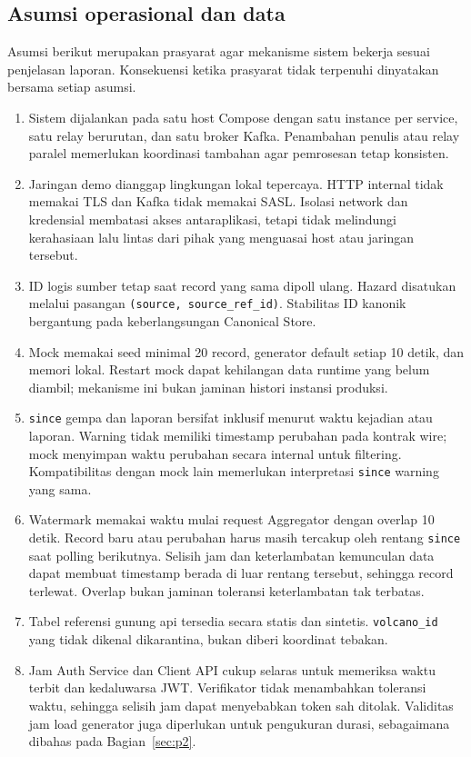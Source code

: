 \subsection{Asumsi operasional dan data}
Asumsi berikut merupakan prasyarat agar mekanisme sistem bekerja sesuai penjelasan laporan. Konsekuensi ketika prasyarat tidak terpenuhi dinyatakan bersama setiap asumsi.
\begin{enumerate}
\item Sistem dijalankan pada satu host Compose dengan satu instance per service, satu relay berurutan, dan satu broker Kafka. Penambahan penulis atau relay paralel memerlukan koordinasi tambahan agar pemrosesan tetap konsisten.
\item Jaringan demo dianggap lingkungan lokal tepercaya. HTTP internal tidak memakai TLS dan Kafka tidak memakai SASL. Isolasi network dan kredensial membatasi akses antaraplikasi, tetapi tidak melindungi kerahasiaan lalu lintas dari pihak yang menguasai host atau jaringan tersebut.
\item ID logis sumber tetap saat record yang sama dipoll ulang. Hazard disatukan melalui pasangan \texttt{(source, source\_ref\_id)}. Stabilitas ID kanonik bergantung pada keberlangsungan Canonical Store.
\item Mock memakai seed minimal 20 record, generator default setiap 10 detik, dan memori lokal. Restart mock dapat kehilangan data runtime yang belum diambil; mekanisme ini bukan jaminan histori instansi produksi.
\item \texttt{since} gempa dan laporan bersifat inklusif menurut waktu kejadian atau laporan. Warning tidak memiliki timestamp perubahan pada kontrak wire; mock menyimpan waktu perubahan secara internal untuk filtering. Kompatibilitas dengan mock lain memerlukan interpretasi \texttt{since} warning yang sama.
\item Watermark memakai waktu mulai request Aggregator dengan overlap 10 detik. Record baru atau perubahan harus masih tercakup oleh rentang \texttt{since} saat polling berikutnya. Selisih jam dan keterlambatan kemunculan data dapat membuat timestamp berada di luar rentang tersebut, sehingga record terlewat. Overlap bukan jaminan toleransi keterlambatan tak terbatas.
\item Tabel referensi gunung api tersedia secara statis dan sintetis. \texttt{volcano\_id} yang tidak dikenal dikarantina, bukan diberi koordinat tebakan.
\item Jam Auth Service dan Client API cukup selaras untuk memeriksa waktu terbit dan kedaluwarsa JWT. Verifikator tidak menambahkan toleransi waktu, sehingga selisih jam dapat menyebabkan token sah ditolak. Validitas jam load generator juga diperlukan untuk pengukuran durasi, sebagaimana dibahas pada Bagian~\ref{sec:p2}.
\end{enumerate}

